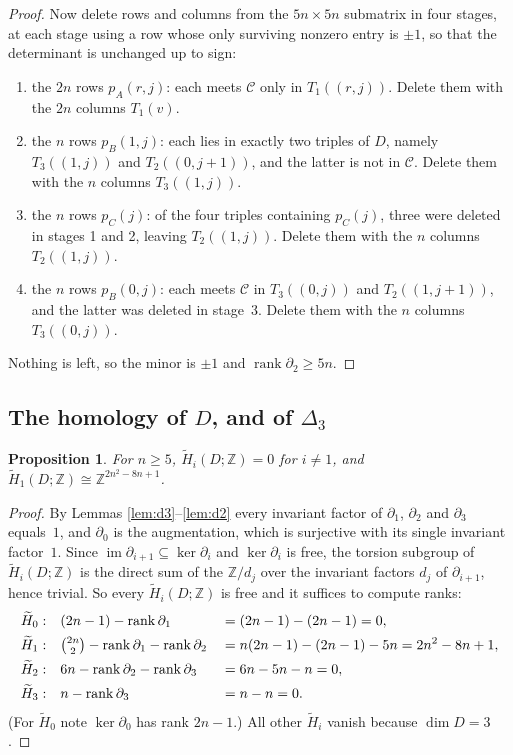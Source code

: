 \documentclass[11pt]{amsart}
\newtheorem{proposition}[theorem]{Proposition}
\theoremstyle{definition}
\DeclareMathOperator{\rank}{rank}
\newcommand{\Dl}{\Delta}
\newcommand{\Zm}{\mathbb{Z}}
\begin{document}
\begin{proof}
Now delete rows and columns from the $5n\times5n$ submatrix in four stages, at each stage using a row
whose only surviving nonzero entry is $\pm1$, so that the determinant is unchanged up to sign:
\begin{enumerate}
\item the $2n$ rows $p_A(r,j)$: each meets $\mathcal C$ only in $T_1((r,j))$. Delete them with the
 $2n$ columns $T_1(v)$.
\item the $n$ rows $p_B(1,j)$: each lies in exactly two triples of $D$, namely $T_3((1,j))$ and
 $T_2((0,j{+}1))$, and the latter is not in $\mathcal C$. Delete them with the $n$ columns
 $T_3((1,j))$.
\item the $n$ rows $p_C(j)$: of the four triples containing $p_C(j)$, three were deleted in stages 1
 and 2, leaving $T_2((1,j))$. Delete them with the $n$ columns $T_2((1,j))$.
\item the $n$ rows $p_B(0,j)$: each meets $\mathcal C$ in $T_3((0,j))$ and $T_2((1,j{+}1))$, and
 the latter was deleted in stage~3. Delete them with the $n$ columns $T_3((0,j))$.
\end{enumerate}
Nothing is left, so the minor is $\pm1$ and $\rank\partial_2\ge5n$.
\end{proof}

\subsection{The homology of \texorpdfstring{$D$}{D}, and of \texorpdfstring{$\Dl_3$}{Delta 3}}

\begin{proposition}\label{prop:dualhom}
For $n\ge5$, $\widetilde H_i(D;\Zm)=0$ for $i\ne1$, and $\widetilde H_1(D;\Zm)\cong\Zm^{2n^2-8n+1}$.
\end{proposition}

\begin{proof}
By Lemmas \ref{lem:d3}--\ref{lem:d2} every invariant factor of $\partial_1$, $\partial_2$ and
$\partial_3$ equals~$1$, and $\partial_0$ is the augmentation, which is surjective with its single
invariant factor~$1$. Since $\operatorname{im}\partial_{i+1}\subseteq\ker\partial_i$ and
$\ker\partial_i$ is free, the torsion subgroup of $\widetilde H_i(D;\Zm)$ is the direct sum of the
$\Zm/d_j$ over the invariant factors $d_j$ of $\partial_{i+1}$, hence trivial. So every
$\widetilde H_i(D;\Zm)$ is free and it suffices to compute ranks:
\[
\begin{aligned}
 \widetilde H_0&: && (2n-1)-\rank\partial_1 &&= (2n-1)-(2n-1)=0,\\
 \widetilde H_1&: && \tbinom{2n}{2}-\rank\partial_1-\rank\partial_2
   &&= n(2n-1)-(2n-1)-5n=2n^2-8n+1,\\
 \widetilde H_2&: && 6n-\rank\partial_2-\rank\partial_3 &&= 6n-5n-n=0,\\
 \widetilde H_3&: && n-\rank\partial_3 &&= n-n=0 .
\end{aligned}
\]
(For $\widetilde H_0$ note $\ker\partial_0$ has rank $2n-1$.) All other $\widetilde H_i$ vanish
because $\dim D=3$.
\end{proof}
\end{document}
